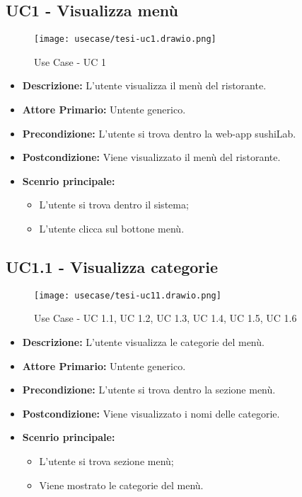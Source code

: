 \subsection{UC1 - Visualizza menù}
\begin{figure}[H]
    \centering
    \texttt{[image: usecase/tesi-uc1.drawio.png]}
    \caption{Use Case - UC 1}
\end{figure}
\begin{itemize}
    \item \textbf{Descrizione:} L'utente visualizza il menù del ristorante.
    \item \textbf{Attore Primario:} Untente generico.
    \item \textbf{Precondizione:} L'utente si trova dentro la web-app sushiLab.
    \item \textbf{Postcondizione:} Viene visualizzato il menù del ristorante.
    \item \textbf{Scenrio principale:}
    \begin{itemize}
        \item L'utente si trova dentro il sistema;
        \item L'utente clicca sul bottone menù.
    \end{itemize}
\end{itemize}
\subsection{UC1.1 - Visualizza categorie}
\begin{figure}[H]
    \centering
    \texttt{[image: usecase/tesi-uc11.drawio.png]}
    \caption{Use Case - UC 1.1, UC 1.2, UC 1.3, UC 1.4, UC 1.5, UC 1.6}
\end{figure}
\begin{itemize}
    \item \textbf{Descrizione:} L'utente visualizza le categorie del menù.
    \item \textbf{Attore Primario:} Untente generico.
    \item \textbf{Precondizione:} L'utente si trova dentro la sezione menù.
    \item \textbf{Postcondizione:} Viene visualizzato i nomi delle categorie.
    \item \textbf{Scenrio principale:}
    \begin{itemize}
        \item L'utente si trova sezione menù;
        \item Viene mostrato le categorie del menù.
    \end{itemize}
\end{itemize}
